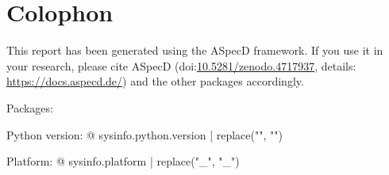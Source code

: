 \section*{Colophon}

This report has been generated using the ASpecD framework. If you use it in your research, please cite ASpecD (doi:\href{https://doi.org/10.5281/zenodo.4717937}{10.5281/zenodo.4717937}, details: \url{https://docs.aspecd.de/}) and the other packages accordingly.

Packages: %


Python version: {@ sysinfo.python.version | replace("\n", "") }

Platform: {@ sysinfo.platform | replace("_", "\_") }
